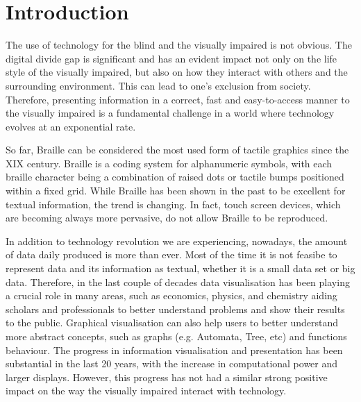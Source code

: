 \chapter{Introduction}
The use of technology for the blind and the visually impaired is not obvious. The digital divide gap is significant and has an evident impact not only on the life style of the visually impaired, but also on how they interact with others and the surrounding environment. This can lead to one's exclusion from society. Therefore, presenting information in a correct, fast and easy-to-access manner to the visually impaired is a fundamental challenge in a world where technology evolves at an exponential rate. \par

So far, Braille can be considered the most used form of tactile graphics since the XIX century\cite{andrea2009history}. Braille is a coding system for alphanumeric symbols, with each braille character being a combination of raised dots or tactile bumps positioned within a fixed grid. While Braille has been shown in the past to be excellent for textual information, the trend is changing. In fact, touch screen devices, which are becoming always more pervasive, do not allow Braille to be reproduced. \par

In addition to technology revolution we are experiencing, nowadays, the amount of data  daily produced is more than ever. Most of the time it is not feasibe to represent data and its information as textual, whether it is a small data set or big data. Therefore, in the last couple of decades data visualisation has been playing a crucial role in many areas, such as economics, physics, and chemistry aiding scholars and professionals to better understand problems and show their results to the public. Graphical visualisation can also help users to better understand more abstract concepts, such as graphs (e.g. Automata, Tree, etc) and functions behaviour. 
The progress in information visualisation and presentation has been substantial in the last 20 years, with the increase in computational power and larger displays. However, this progress has not had a similar strong positive impact on the way the visually impaired interact with technology. \par 

